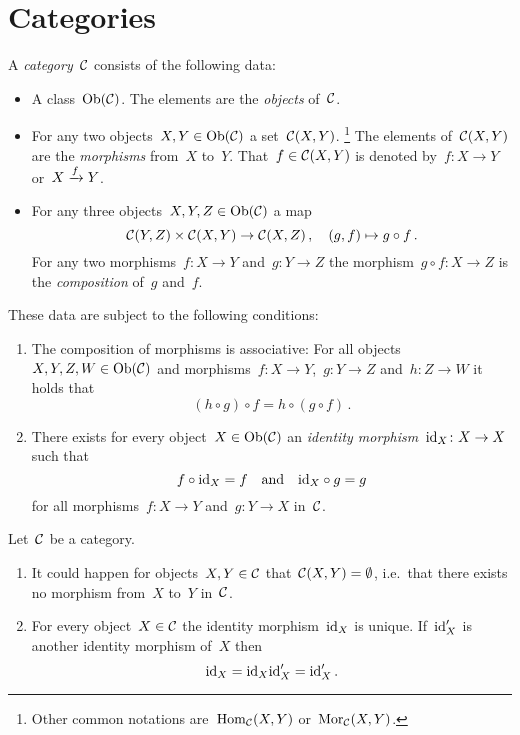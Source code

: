 \section{Categories}

\begin{definition}
  A \emph{category}~$\mathcal{C}$ consists of the following data:
  \begin{itemize}
    \item
      A class~$\operatorname{Ob}(\mathcal{C})$.
      The elements are the \emph{objects} of~$\mathcal{C}$.
    \item
      For any two objects~$X, Y \in \operatorname{Ob}(\mathcal{C})$ a set~$\mathcal{C}(X,Y)$.%
      \footnote{Other common notations are~$\operatorname{Hom}_{\mathcal{C}}(X,Y)$ or~$\operatorname{Mor}_{\mathcal{C}}(X,Y)$.}
      The elements of~$\mathcal{C}(X, Y)$ are the \emph{morphisms} from~$X$ to~$Y$.
      That~$f \in \mathcal{C}(X,Y)$ is denoted by~$f \colon X \to Y$ or~$X \xrightarrow{f} Y$.
    \item
      For any three objects~$X, Y, Z \in \operatorname{Ob}(\mathcal{C})$ a map
      \[
                \mathcal{C}(Y,Z) \times \mathcal{C}(X,Y)
        \to     \mathcal{C}(X,Z) \,,
        \quad   (g, f)
        \mapsto g \circ f \,.
      \]
      For any two morphisms~$f \colon X \to Y$ and~$g \colon Y \to Z$ the morphism~$g \circ f \colon X \to Z$ is the \emph{composition} of~$g$ and~$f$.
  \end{itemize}
  These data are subject to the following conditions:
  \begin{enumerate}[label=(C\arabic*)]
    \item
      The composition of morphisms is associative:
      For all objects~$X, Y, Z, W \in \operatorname{Ob}(\mathcal{C})$ and morphisms~$f \colon X \to Y$,~$g \colon Y \to Z$ and~$h \colon Z \to W$ it holds that
      \[
          (h \circ g) \circ f
        = h \circ (g \circ f) \,.
      \]
    \item
      There exists for every object~$X \in \operatorname{Ob}(\mathcal{C})$ an \emph{identity morphism}~$\mathrm{id}_X \colon X \to X$ such that
      \[
        f \circ \mathrm{id}_X = f
        \quad\text{and}\quad
        \mathrm{id}_X \circ g = g
      \]
      for all morphisms~$f \colon X \to Y$ and~$g \colon Y \to X$ in~$\mathcal{C}$.
  \end{enumerate}
\end{definition}


\begin{remark}
  Let~$\mathcal{C}$ be a category.
  \begin{enumerate}
    \item
      It could happen for objects~$X, Y \in \mathcal{C}$ that~$\mathcal{C}(X,Y) = \emptyset$, i.e.\ that there exists no morphism from~$X$ to~$Y$ in~$\mathcal{C}$.
    \item
      For every object~$X \in \mathcal{C}$ the identity morphism~$\mathrm{id}_X$ is unique.
      If~$\mathrm{id}'_X$ is another identity morphism of~$X$ then
      \[
          \mathrm{id}_X
        = \mathrm{id}_X \mathrm{id}'_X
        = \mathrm{id}'_X \,.
      \]
  \end{enumerate}
\end{remark}


